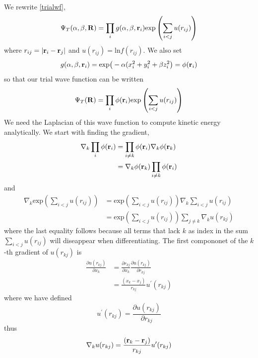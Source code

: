 \documentclass[english, a4paper]{article}
\begin{document}
We rewrite \eqref{trialwf},
\begin{equation}
 \Psi_T(\alpha, \beta, {\bf R}) = \prod_i g(\alpha,\beta,{\bf r}_i)\textrm{exp} \left(
 \sum_{i<j}u(r_{ij}) \right)
 \label{wfinteracting}
\end{equation}
where $r_{ij} = |{\bf r}_i - {\bf r}_j|$ and $u(r_{ij}) = \textrm{ln}f(r_{ij})$.  We also set
\begin{equation}
 g(\alpha, \beta, {\bf r}_i) = \textrm{exp}\bigr(-\alpha(x_i^2 + y_i^2 + \beta z_i^2\bigr) = \phi({\bf r}_i)
\end{equation}
so that our trial wave function can be written
\begin{equation}
 \Psi_T({\bf R}) = \prod_i \phi({\bf r}_i) \textrm{exp} \left(
 \sum_{i<j}u(r_{ij}) \right)
 \label{wfinteracting2}
\end{equation}
We need the Laplacian of this wave function to compute kinetic energy analytically.
We start with finding the gradient,
\begin{align}
 \nabla_k \prod_i \phi({\bf r}_i) &= \prod_{i\neq k} \phi({\bf r}_i) \nabla_k \phi({\bf r}_k) \\
                                  &= \nabla_k\phi({\bf r}_k) \prod_{i\neq k}\phi({\bf r}_i)
\end{align}
and 
\begin{align}
 \nabla_k \textrm{exp} \left( \sum_{i<j}u(r_{ij}) \right) &=
 \textrm{exp} \left( \sum_{i<j}u(r_{ij}) \right) \nabla_k \sum_{i<j}u(r_{ij}) \\ &= 
 \textrm{exp} \left( \sum_{i<j}u(r_{ij}) \right)  \sum_{j\neq k}\nabla_k u( r_{kj})
\end{align}
where the last equality follows because all terms that lack $k$ as index in the sum $\sum_{i<j}u(r_{ij})$ 
will diseappear when differentiating. The first compononet of the $k$-th gradient of $u(r_{kj})$ is
\begin{align}
 \frac{\partial u(r_{kj})}{\partial x_k} &= \frac{\partial r_{kj}}{\partial x_k} 
 \frac{\partial u(r_{kj})}{\partial r_{kj}} \\
 &= \frac{(x_k - x_j)}{r_{kj}}u^\prime(r_{kj})
\end{align}
where we have defined
\begin{equation}
 u^\prime(r_{kj}) = \frac{\partial u(r_{kj})}{\partial r_{kj}}
\end{equation}
thus
\begin{equation}
 \nabla_k u(r_{kj}) = \frac{({\bf r}_k - {\bf r}_j)}{r_{kj}} u^\prime(r_{kj})
\end{equation}
\end{document}
